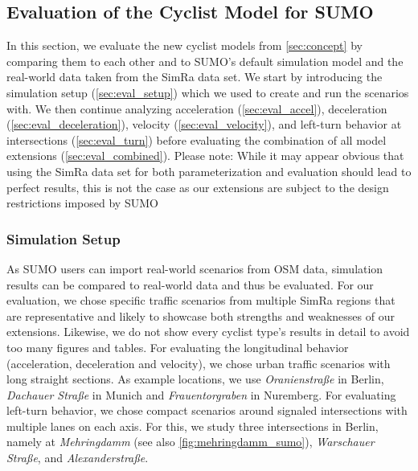 \subsection{Evaluation of the Cyclist Model for SUMO}
\label{subsec:evaluation_sumo}
In this section, we evaluate the new cyclist models from \cref{sec:concept} by comparing them to each other and to SUMO's default simulation model and the real-world data taken from the SimRa data set.
We start by introducing the simulation setup (\cref{sec:eval_setup}) which we used to create and run the scenarios with.
We then continue analyzing acceleration (\cref{sec:eval_accel}), deceleration (\cref{sec:eval_deceleration}), velocity (\cref{sec:eval_velocity}), and left-turn behavior at intersections (\cref{sec:eval_turn}) before evaluating the combination of all model extensions (\cref{sec:eval_combined}).
Please note: While it may appear obvious that using the SimRa data set for both parameterization and evaluation should lead to perfect results, this is not the case as our extensions are subject to the design restrictions imposed by SUMO

\subsubsection{Simulation Setup}
\label{subsubsec:simulation_setup}
As SUMO users can import real-world scenarios from OSM data, simulation results can be compared to real-world data and thus be evaluated.
For our evaluation, we chose specific traffic scenarios from multiple SimRa regions that are representative and likely to showcase both strengths and weaknesses of our extensions.
Likewise, we do not show every cyclist type's results in detail to avoid too many figures and tables.
For evaluating the longitudinal behavior (acceleration, deceleration and velocity), we chose urban traffic scenarios with long straight sections.
As example locations, we use \textit{Oranienstraße} in Berlin, \textit{Dachauer Straße} in Munich and \textit{Frauentorgraben} in Nuremberg.
For evaluating left-turn behavior, we chose compact scenarios around signaled intersections with multiple lanes on each axis.
For this, we study three intersections in Berlin, namely at \textit{Mehringdamm} (see also \cref{fig:mehringdamm_sumo}), \textit{Warschauer Straße}, and \textit{Alexanderstraße}.

